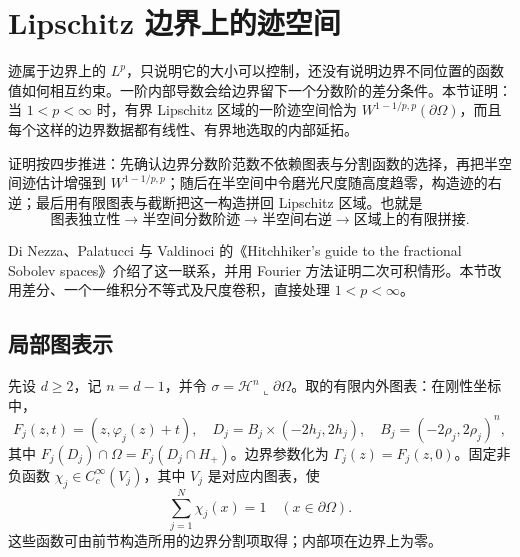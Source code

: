 \section{Lipschitz 边界上的迹空间}
\label{b1:sec:2303}

迹属于边界上的 \(L^p\)，只说明它的大小可以控制，还没有说明边界不同位置的函数值如何相互约束。一阶内部导数会给边界留下一个分数阶的差分条件。本节证明：当 \(1<p<\infty\) 时，有界 Lipschitz 区域的一阶迹空间恰为 \(W^{1-1/p,p}(\partial\Omega)\)，而且每个这样的边界数据都有线性、有界地选取的内部延拓。

\ProseParagraphBreak

证明按四步推进：先确认边界分数阶范数不依赖图表与分割函数的选择，再把半空间迹估计增强到 \(W^{1-1/p,p}\)；随后在半空间中令磨光尺度随高度趋零，构造迹的右逆；最后用有限图表与截断把这一构造拼回 Lipschitz 区域。也就是
\[
 \text{图表独立性}
 \longrightarrow \text{半空间分数阶迹}
 \longrightarrow \text{半空间右逆}
 \longrightarrow \text{区域上的有限拼接}.
\]

Di Nezza、Palatucci 与 Valdinoci 的《Hitchhiker's guide to the fractional Sobolev spaces》\cite[Section 2, Proposition 3.8]{DiNezza2012Hitchhikers}介绍了这一联系，并用 Fourier 方法证明二次可积情形。本节改用差分、一个一维积分不等式及尺度卷积，直接处理 \(1<p<\infty\)。

\subsection{局部图表示}
\label{b1:subsec:230301}

先设 \(d\ge2\)，记 \(n=d-1\)，并令
\(\sigma=\mathcal H^n\llcorner\partial\Omega\)。取的有限内外图表：在刚性坐标中，
\[
 F_j(z,t)=(z,\varphi_j(z)+t),\quad
 D_j=B_j\times(-2h_j,2h_j),\quad
 B_j=(-2\rho_j,2\rho_j)^n,
\]
其中 \(F_j(D_j)\cap\Omega=F_j(D_j\cap H_+)\)。边界参数化为
\(\Gamma_j(z)=F_j(z,0)\)。固定非负函数 \(\chi_j\in C_c^\infty(V_j)\)，其中 \(V_j\) 是对应内图表，使
\[
 \sum_{j=1}^N\chi_j(x)=1\quad(x\in\partial\Omega).
\]
这些函数可由前节构造所用的边界分割项取得；内部项在边界上为零。

\ProseParagraphBreak

